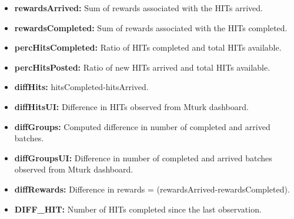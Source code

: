 \begin{itemize}[noitemsep]
\item \textbf{rewardsArrived:} Sum of rewards associated with the HITs arrived.
\item \textbf{rewardsCompleted:} Sum of rewards associated with the HITs completed.
\item \textbf{percHitsCompleted:} Ratio of HITs completed and total HITs available.
\item \textbf{percHitsPosted:} Ratio of new HITs arrived and total HITs available.
\item \textbf{diffHits:} hitsCompleted-hitsArrived.
\item \textbf{diffHitsUI:} Difference in HITs observed from Mturk dashboard.
\item \textbf{diffGroups:} Computed difference in number of completed and arrived batches.
\item \textbf{diffGroupsUI:} Difference in number of completed and arrived batches observed from Mturk dashboard.
\item \textbf{diffRewards:} Difference in rewards = (rewardsArrived-rewardsCompleted).
\item \textbf{DIFF\_HIT:} Number of HITs completed since the last observation.
\end{itemize}